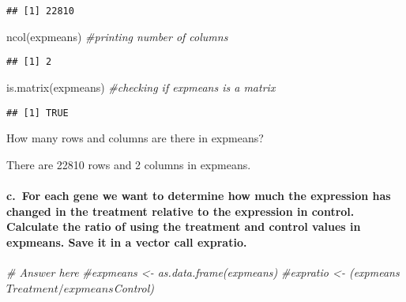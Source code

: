 \documentclass[
]{article}
\newenvironment{Shaded}{\begin{snugshade}}{\end{snugshade}}
\newcommand{\CommentTok}[1]{\textcolor[rgb]{0.56,0.35,0.01}{\textit{#1}}}
\newcommand{\FunctionTok}[1]{\textcolor[rgb]{0.00,0.00,0.00}{#1}}
\newcommand{\NormalTok}[1]{#1}
\begin{document}
\begin{verbatim}
## [1] 22810
\end{verbatim}

\begin{Shaded}
\begin{Highlighting}[]
\FunctionTok{ncol}\NormalTok{(expmeans) }\CommentTok{\#printing number of columns}
\end{Highlighting}
\end{Shaded}

\begin{verbatim}
## [1] 2
\end{verbatim}

\begin{Shaded}
\begin{Highlighting}[]
\FunctionTok{is.matrix}\NormalTok{(expmeans) }\CommentTok{\#checking if expmeans is a matrix}
\end{Highlighting}
\end{Shaded}

\begin{verbatim}
## [1] TRUE
\end{verbatim}

How many rows and columns are there in expmeans?

There are 22810 rows and 2 columns in expmeans.

\hypertarget{c.-for-each-gene-we-want-to-determine-how-much-the-expression-has-changed-in-the-treatment-relative-to-the-expression-in-control.-calculate-the-ratio-of-using-the-treatment-and-control-values-in-expmeans.-save-it-in-a-vector-call-expratio.}{%
\paragraph{c.~For each gene we want to determine how much the expression
has changed in the treatment relative to the expression in control.
Calculate the ratio of using the treatment and control values in
expmeans. Save it in a vector call
expratio.}\label{c.-for-each-gene-we-want-to-determine-how-much-the-expression-has-changed-in-the-treatment-relative-to-the-expression-in-control.-calculate-the-ratio-of-using-the-treatment-and-control-values-in-expmeans.-save-it-in-a-vector-call-expratio.}}

\begin{Shaded}
\begin{Highlighting}[]
\CommentTok{\# Answer here}
\CommentTok{\#expmeans \textless{}{-} as.data.frame(expmeans)}
\CommentTok{\#expratio \textless{}{-} (expmeans$Treatment/expmeans$Control)}
\end{Highlighting}
\end{Shaded}
\end{document}
